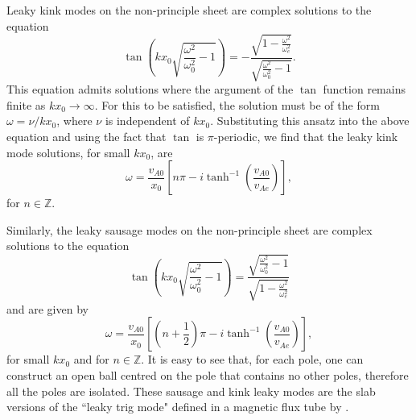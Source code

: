 Leaky kink modes on the non-principle sheet are complex solutions to the equation
\begin{equation}
\tan\left(kx_0\sqrt{\frac{\omega^2}{\omega_0^2} - 1}\right) = -\frac{\sqrt{1 - \frac{\omega^2}{\omega_e^2}}}{\sqrt{\frac{\omega^2}{\omega_0^2} - 1}}.
\end{equation}
This equation admits solutions where the argument of the $\tan$ function remains finite as $kx_0 \to \infty$. For this to be satisfied, the solution must be of the form $\omega = \nu / kx_0$, where $\nu$ is independent of $kx_0$. Substituting this ansatz into the above equation and using the fact that $\tan$ is $\pi$-periodic, we find that the leaky kink mode solutions, for small $kx_0$, are
\begin{equation}
\omega = \frac{v_{A0}}{x_0}\left[ n\pi - i\tanh^{-1}\left( \frac{v_{A0}}{v_{Ae}} \right) \right],
\end{equation}
for $n \in \mathbb{Z}$.

Similarly, the leaky sausage modes on the non-principle sheet are complex solutions to the equation
\begin{equation}
\tan\left(kx_0\sqrt{\frac{\omega^2}{\omega_0^2} - 1}\right) = \frac{\sqrt{\frac{\omega^2}{\omega_0^2} - 1}}{\sqrt{1 - \frac{\omega^2}{\omega_e^2}}}
\end{equation}
and are given by
\begin{equation}
\omega = \frac{v_{A0}}{x_0}\left[ (n + \frac{1}{2})\pi - i\tanh^{-1}\left( \frac{v_{A0}}{v_{Ae}} \right) \right],
\end{equation}
for small $kx_0$ and for $n \in \mathbb{Z}$. It is easy to see that, for each pole, one can construct an open ball centred on the pole that contains no other poles, therefore all the poles are isolated. These sausage and kink leaky modes are the slab versions of the ``leaky trig mode" defined in a magnetic flux tube by \cite{cal03}.

